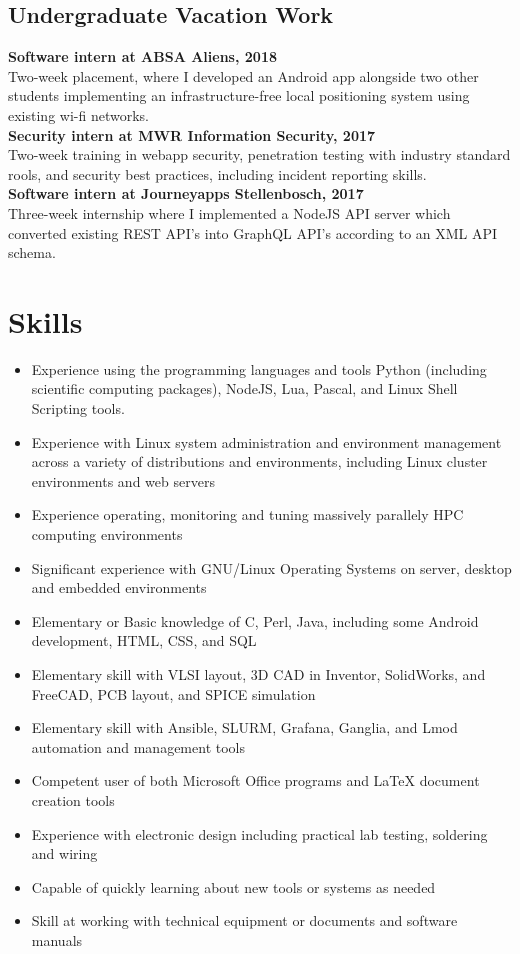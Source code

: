 \documentclass[10pt,a4paper,notitlepage]{article}
\begin{document}
\subsection*{Undergraduate Vacation Work}
\begin{spacing}{1.1}
\textbf{Software intern at ABSA Aliens, 2018}\\
Two-week placement, where I developed an Android app alongside two other students implementing an
infrastructure-free local positioning system using existing wi-fi networks. 
    \vspace*{0.5em}\\
\textbf{Security intern at MWR Information Security, 2017}\\
Two-week training in webapp security, penetration testing with industry standard rools, and security
best practices, including incident reporting skills.
    \vspace*{0.5em}\\
\textbf{Software intern at Journeyapps Stellenbosch, 2017}\\
Three-week internship where I implemented a NodeJS API server which converted existing REST API's
into GraphQL API's according to an XML API schema.
\end{spacing}

\section*{Skills}
\begin{itemize}[noitemsep]
	\setlength\itemsep{0.02em}
    \item Experience using the programming languages and tools Python (including scientific computing packages), NodeJS, Lua, Pascal, and Linux Shell Scripting tools.
    \item Experience with Linux system administration and environment management across a variety of distributions and environments, including Linux cluster environments and web servers
    \item Experience operating, monitoring and tuning massively parallely HPC computing environments
    \item Significant experience with GNU/Linux Operating Systems on server, desktop and embedded environments
    \item Elementary or Basic knowledge of C, Perl, Java, including some Android development, HTML, CSS, and SQL
    \item Elementary skill with VLSI layout, 3D CAD in Inventor, SolidWorks, and FreeCAD, PCB layout, and SPICE simulation
    \item Elementary skill with Ansible, SLURM, Grafana, Ganglia, and Lmod automation and management tools
    \item Competent user of both Microsoft Office programs and LaTeX document creation tools
    \item Experience with electronic design including practical lab testing, soldering and wiring
    \item Capable of quickly learning about new tools or systems as needed
    \item Skill at working with technical equipment or documents and software manuals
\end{itemize}
\end{document}
